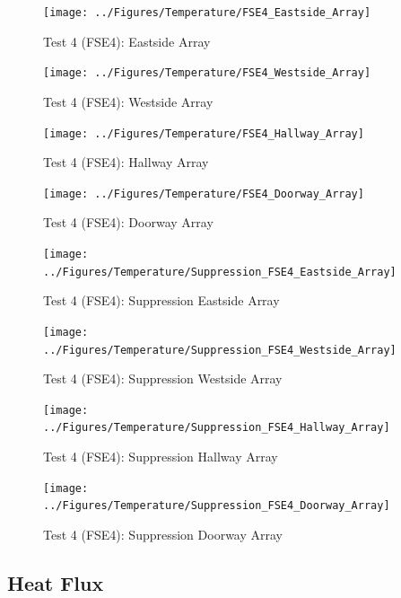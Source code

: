 \documentclass[12pt,oneside]{book}
\begin{document}
\begin{figure}[!ht]
	\texttt{[image: ../Figures/Temperature/FSE4\_Eastside\_Array]}
	\caption{Test 4 (FSE4): Eastside Array}
	\label{fig:Test_4_Eastside_Array}
\end{figure}

\begin{figure}[!ht]
	\texttt{[image: ../Figures/Temperature/FSE4\_Westside\_Array]}
	\caption{Test 4 (FSE4): Westside Array}
	\label{fig:Test_4_Westside_Array}
\end{figure}

\begin{figure}[!ht]
	\texttt{[image: ../Figures/Temperature/FSE4\_Hallway\_Array]}
	\caption{Test 4 (FSE4): Hallway Array}
	\label{fig:Test_4_Hallway_Array}
\end{figure}

\begin{figure}[!ht]
	\texttt{[image: ../Figures/Temperature/FSE4\_Doorway\_Array]}
	\caption{Test 4 (FSE4): Doorway Array}
	\label{fig:Test_4_Doorway_Array}
\end{figure}

\begin{figure}[!ht]
	\texttt{[image: ../Figures/Temperature/Suppression\_FSE4\_Eastside\_Array]}
	\caption{Test 4 (FSE4): Suppression Eastside Array}
	\label{fig:Test_4_Suppression_Eastside_Array}
\end{figure}

\begin{figure}[!ht]
	\texttt{[image: ../Figures/Temperature/Suppression\_FSE4\_Westside\_Array]}
	\caption{Test 4 (FSE4): Suppression Westside Array}
	\label{fig:Test_4_Suppression_Westside_Array}
\end{figure}

\begin{figure}[!ht]
	\texttt{[image: ../Figures/Temperature/Suppression\_FSE4\_Hallway\_Array]}
	\caption{Test 4 (FSE4): Suppression Hallway Array}
	\label{fig:Test_4_Suppression_Hallway_Array}
\end{figure}

\begin{figure}[!ht]
	\texttt{[image: ../Figures/Temperature/Suppression\_FSE4\_Doorway\_Array]}
	\caption{Test 4 (FSE4): Suppression Doorway Array}
	\label{fig:Test_4_Suppression_Doorway_Array}
\end{figure}

\subsection{Heat Flux}
\label{subsec:Heat_Flux}
\end{document}
